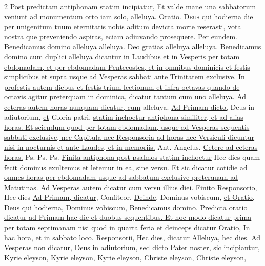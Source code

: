 \begin{multicols*}{2}
\newline \ul{Post predictam antiphonam statim incipiatur,}
 Et valde mane una sabbatorum veniunt ad monumentum orto iam solo, alleluya. {\color{Red} Oratio.}
\lettrine[lines=2]{\zallmancaps \color{Red} D}{eus} \hypertarget{deus-qui-hodierna-pasche}{\label{deus-qui-hodierna-pasche}} qui hodierna die per unigenitum tuum eternitatis nobis aditum devicta morte reserasti, vota nostra que preveniendo aspiras, eciam adiuvando prosequere. Per eundem. Benedicamus domino alleluya alleluya. Deo gratias alleluya alleluya.
\newline Benedicamus domino \ul{cum duplici} alleluya \ul{dicantur in Laudibus et in Vesperis per totam ebdomadam, et per ebdomadam Pentecostes, et in omnibus dominicis et festis simplicibus et supra usque ad Vesperas sabbati ante Trinitatem exclusive. In profestis autem diebus et festis trium lectionum et infra octavas quando de octavis agitur preterquam in dominica, dicatur tantum cum uno} alleluya. \ul{Ad ceteras autem horas nunquam dicatur, cum} alleluya.
\newline \ul{Ad Primam dicto,} Deus in adiutorium, \ul{et} Gloria patri, \ul{statim inchoetur antiphona similiter, et ad alias horas. Et sciendum quod per totam ebdomadam, usque ad Vesperas sequentis sabbati exclusive, nec Capitula nec Responsoria ad horas nec Versiculi dicuntur nisi in nocturnis et ante Laudes, et in memoriis.} {\color{Red} Ant.} Angelus. \ul{Cetere ad ceteras horas.} {\color{Red} Ps.}  {\color{Red} Ps.}  {\color{Red} Ps.}  \ul{Finita antiphona post psalmos statim inchoetur} \R Hec dies quam fecit dominus exultemus et letemur in ea, \ul{sine versu. Et sic dicatur cotidie ad omnes horas per ebdomadam usque ad sabbatum exclusive preterquam ad Matutinas. Ad Vesperas autem dicatur cum versu illius diei.}
\newline \ul{Finito Responsorio,} Hec dies \ul{Ad Primam, dicatur,} Confiteor. \ul{Deinde,} Dominus vobiscum, \ul{et Oratio,} \hyperlink{deus-qui-hodierna-pasche}{Deus qui hodierna,} Dominus vobiscum, Benedicamus domino. \ul{Predicta oratio dicatur ad Primam hac die et duobus sequentibus. Et hoc modo dicatur prima per totam septimanam nisi quod in quarta feria et deinceps dicatur Oratio,} \hyperlink{in-hac-hora}{In hac hora,} \ul{et in sabbato loco. Responsorii,} Hec dies, \ul{dicatur} Alleluya, hec dies.
\newline \ul{Ad Vesperas non dicatur,} Deus in adiutorium, \ul{sed dicto} Pater noster, \ul{sic incipiantur,} Kyrie eleyson, Kyrie eleyson, Kyrie eleyson, Christe eleyson, Christe eleyson,

\end{multicols*}
